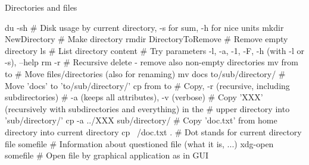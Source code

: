 \documentclass[compress, xelatex, 11pt, xcolor=svgnames, aspectratio=169,
	hyperref={
		bookmarks=true,
		unicode=true,
		colorlinks=true,
		pdftitle={Linux, command line and MetaCentrum},
		plainpages=false,
		pdfauthor={Vojtech Zeisek},
		pdfsubject={Course about use of Linux command line, writing shell scripts and using MetaCentrum of CESNET},
		pdfcreator={XeLaTeX},
		pdfkeywords={Linux, GNU, BASH, shell, command line, MetaCentrum},
		linkcolor=DarkRed, %
		anchorcolor=DarkBlue, %
		citecolor=Indigo, %
		filecolor=NavyBlue, %
		menucolor=DarkMagenta, %
		urlcolor=DarkBlue, %
		},
	url={hyphens, lowtilde} %
	]{beamer}
\begin{document}
\begin{frame}[fragile]{Directories and files}
	\begin{bashcode}
    du -sh # Disk usage by current directory, -s for sum, -h for nice units
    mkdir NewDirectory # Make directory
    rmdir DirectoryToRemove # Remove empty directory
    ls # List directory content
       # Try parameters -l, -a, -1, -F, -h (with -l or -s), --help
    rm -r # Recursive delete - remove also non-empty directories
    mv from to # Move files/directories (also for renaming)
    mv docs to/sub/directory/ # Move 'docs' to 'to/sub/directory/'
    cp from to # Copy, -r (recursive, including subdirectories)
               # -a (keeps all attributes), -v (verbose)
    # Copy 'XXX' (recursively with subdirectories and everything) in the
    # upper directory into 'sub/directory/'
    cp -a ../XXX sub/directory/
    # Copy 'doc.txt' from home directory into current directory
    cp ~/doc.txt . # Dot stands for current directory
    file somefile # Information about questioned file (what it is, ...)
    xdg-open somefile # Open file by graphical application as in GUI
	\end{bashcode}
\end{frame}
\end{document}
